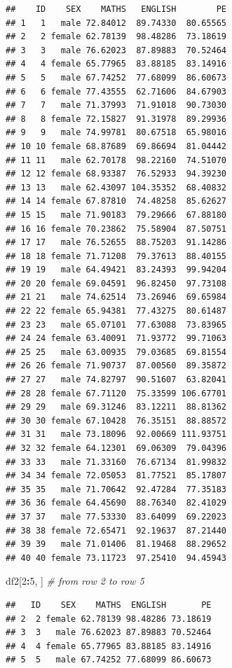 \documentclass[]{book}
\newenvironment{Shaded}{\begin{snugshade}}{\end{snugshade}}
\newcommand{\DecValTok}[1]{\textcolor[rgb]{0.00,0.00,0.81}{#1}}
\newcommand{\CommentTok}[1]{\textcolor[rgb]{0.56,0.35,0.01}{\textit{#1}}}
\newcommand{\OperatorTok}[1]{\textcolor[rgb]{0.81,0.36,0.00}{\textbf{#1}}}
\newcommand{\NormalTok}[1]{#1}
\begin{document}
\begin{verbatim}
##    ID    SEX    MATHS   ENGLISH        PE
## 1   1   male 72.84012  89.74330  80.65565
## 2   2 female 62.78139  98.48286  73.18619
## 3   3   male 76.62023  87.89883  70.52464
## 4   4 female 65.77965  83.88185  83.14916
## 5   5   male 67.74252  77.68099  86.60673
## 6   6 female 77.43555  62.71606  84.67903
## 7   7   male 71.37993  71.91018  90.73030
## 8   8 female 72.15827  91.31978  89.29936
## 9   9   male 74.99781  80.67518  65.98016
## 10 10 female 68.87689  69.86694  81.04442
## 11 11   male 62.70178  98.22160  74.51070
## 12 12 female 68.93387  76.52933  94.39230
## 13 13   male 62.43097 104.35352  68.40832
## 14 14 female 67.87810  74.48258  85.62627
## 15 15   male 71.90183  79.29666  67.88180
## 16 16 female 70.23862  75.58904  87.50751
## 17 17   male 76.52655  88.75203  91.14286
## 18 18 female 71.71208  79.37613  88.40155
## 19 19   male 64.49421  83.24393  99.94204
## 20 20 female 69.04591  96.82450  97.73108
## 21 21   male 74.62514  73.26946  69.65984
## 22 22 female 65.94381  77.43275  80.61487
## 23 23   male 65.07101  77.63088  73.83965
## 24 24 female 63.40091  71.93772  99.71063
## 25 25   male 63.00935  79.03685  69.81554
## 26 26 female 71.90737  87.00560  89.35872
## 27 27   male 74.82797  90.51607  63.82041
## 28 28 female 67.71120  75.33599 106.67701
## 29 29   male 69.31246  83.12211  88.81362
## 30 30 female 67.10428  76.35151  88.88572
## 31 31   male 73.18096  92.00669 111.93751
## 32 32 female 64.12301  69.06309  79.04396
## 33 33   male 71.33160  76.67134  81.99832
## 34 34 female 72.05053  81.77521  85.17807
## 35 35   male 71.70642  92.47284  77.35183
## 36 36 female 64.45690  88.76340  82.41029
## 37 37   male 77.53330  83.64099  69.22023
## 38 38 female 72.65471  92.19637  87.21440
## 39 39   male 71.01406  81.19468  88.29652
## 40 40 female 73.11723  97.25410  94.45943
\end{verbatim}

\begin{Shaded}
\begin{Highlighting}[]
\NormalTok{df2[}\DecValTok{2}\OperatorTok{:}\DecValTok{5}\NormalTok{, ] }\CommentTok{# from row 2 to row 5}
\end{Highlighting}
\end{Shaded}

\begin{verbatim}
##   ID    SEX    MATHS  ENGLISH       PE
## 2  2 female 62.78139 98.48286 73.18619
## 3  3   male 76.62023 87.89883 70.52464
## 4  4 female 65.77965 83.88185 83.14916
## 5  5   male 67.74252 77.68099 86.60673
\end{verbatim}
\end{document}
